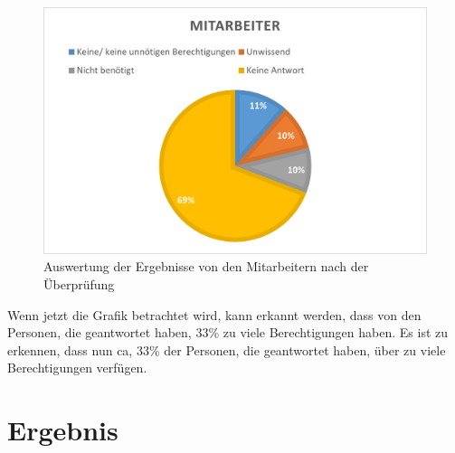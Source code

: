 \begin{figure}[h!]
 \centering
 \includegraphics[width=1\textwidth]{gfx/Picture/Mitarbeiter(korregiert).PNG}
 \caption{Auswertung der Ergebnisse von den Mitarbeitern nach der Überprüfung}
 \label{fig:MitPruf}
\end{figure}
Wenn jetzt die Grafik betrachtet wird, kann erkannt werden, dass von den Personen, die geantwortet haben, 33\% zu viele Berechtigungen haben.
Es ist zu erkennen, dass nun ca, 33\% der Personen, die geantwortet haben, über zu viele Berechtigungen verfügen.
\section{Ergebnis}
\label{sec:Ergebnis}

